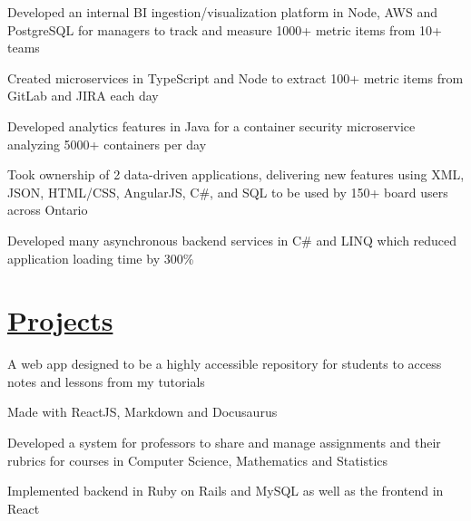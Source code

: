 \documentclass[]{deedy-resume}
\begin{document}
\begin{tightemize}
\item Developed an internal BI ingestion/visualization platform in Node, AWS and PostgreSQL for managers to track and measure 1000+ metric items from 10+ teams
\item Created microservices in TypeScript and Node to extract 100+ metric items from GitLab and JIRA each day
\item Developed analytics features in Java for a container security microservice analyzing 5000+ containers per day
\end{tightemize}
\sectionsep

\begin{tightemize}
\item Took ownership of 2 data-driven applications, delivering new features using XML, JSON, HTML/CSS, AngularJS, C\#, and SQL to be used by 150+ board users across Ontario
\item Developed many asynchronous backend services in C\# and LINQ which reduced application loading time by 300\%
\end{tightemize}
\sectionsep


\section{\href{https://github.com/ItsMeWithTheFace}{Projects}}

\begin{tightemize}
\item A web app designed to be a highly accessible repository for students to access notes and lessons from my tutorials
\item Made with ReactJS, Markdown and Docusaurus
\end{tightemize}
\sectionsep

\location{}
\begin{tightemize}
\item Developed a system for professors to share and manage assignments and their rubrics for courses in Computer Science, Mathematics and Statistics
\item Implemented backend in Ruby on Rails and MySQL as well as the frontend in React
\end{tightemize}
\sectionsep
\end{document}
